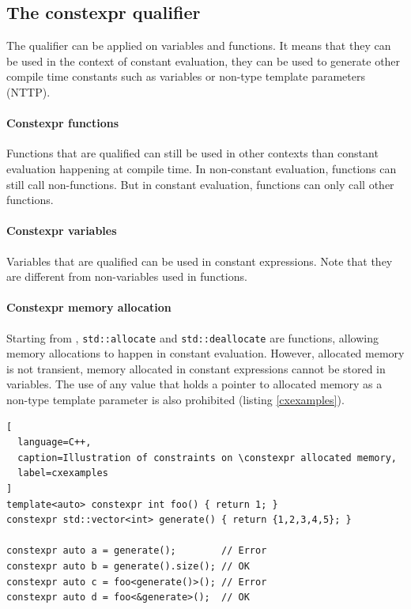 \documentclass[../../main.tex]{subfiles}
\begin{document}
\subsection{The constexpr qualifier}

The \constexpr qualifier can be applied on variables and functions. It means
that they can be used in the context of constant evaluation, \ie they can be
used to generate other compile time constants such as \constexpr variables
or non-type template parameters (NTTP).

\paragraph{Constexpr functions} Functions that are \constexpr qualified can
still be used in other contexts than constant evaluation happening at
compile time. In non-constant evaluation, \constexpr functions can still call
non-\constexpr functions. But in constant evaluation, \constexpr functions can
only call other \constexpr functions.


\paragraph{Constexpr variables} Variables that are \constexpr qualified can be
used in constant expressions. Note that they are different from
non-\constexpr variables used in \constexpr functions.


\paragraph{Constexpr memory allocation} Starting from ,
\lstinline|std::allocate| and \lstinline|std::deallocate| are
\constexpr functions, allowing memory allocations to happen in constant
evaluation. However,
\constexpr allocated memory is not transient, \ie memory allocated in
constant expressions cannot be stored in \constexpr variables.
The use of any value that holds a pointer to \constexpr allocated memory as a
non-type template parameter is also prohibited (listing \ref{cxexamples}).

\begin{lstlisting}[
  language=C++,
  caption=Illustration of constraints on \constexpr allocated memory,
  label=cxexamples
]
template<auto> constexpr int foo() { return 1; }
constexpr std::vector<int> generate() { return {1,2,3,4,5}; }

constexpr auto a = generate();        // Error
constexpr auto b = generate().size(); // OK
constexpr auto c = foo<generate()>(); // Error
constexpr auto d = foo<&generate>();  // OK
\end{lstlisting}
\end{document}
